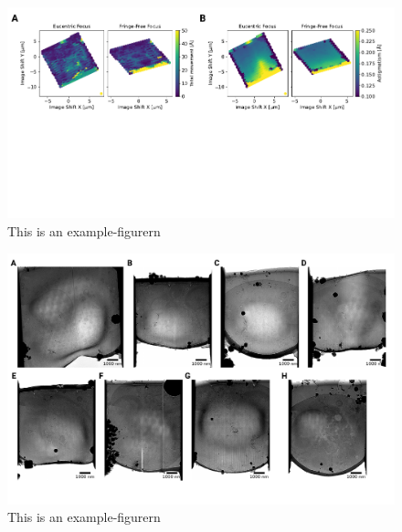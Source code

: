 \documentclass[
]{article}
\begin{document}
\begin{figure}
\hypertarget{fig:approach3}{%
\centering
\includegraphics{figures/example-figure3.pdf}
\caption{This is an example-figurern}\label{fig:approach3}
}
\end{figure}

\begin{figure}
\hypertarget{fig:approach4}{%
\centering
\includegraphics{figures/example-figure4.pdf}
\caption{This is an example-figurern}\label{fig:approach4}
}
\end{figure}
\end{document}
